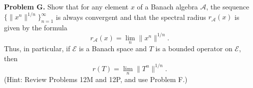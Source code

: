 \textbf{Problem G.} Show that for any element $x$ of a Banach algebra $\mathcal{A}$, the sequence $\{\|x^n\|^{1/n}\}_{n=1}^{\infty}$ is always convergent and that the spectral radius $r_{\mathcal{A}}(x)$ is given by the formula
$$r_{\mathcal{A}}(x) = \lim_{n} \|x^n\|^{1/n}.$$
Thus, in particular, if $\mathcal{E}$ is a Banach space and $T$ is a bounded operator on $\mathcal{E}$, then
$$r(T) = \lim_{n} \|T^n\|^{1/n}.$$
(Hint: Review Problems 12M and 12P, and use Problem F.)
